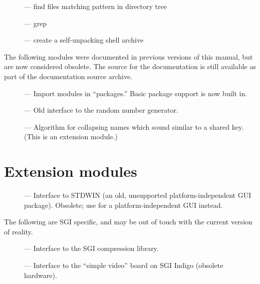 \begin{description}
\item[]
--- find files matching pattern in directory tree

\item[]
--- grep

\item[]
--- create a self-unpacking \UNIX{} shell archive
\end{description}


The following modules were documented in previous versions of this
manual, but are now considered obsolete.  The source for the
documentation is still available as part of the documentation source
archive.

\begin{description}
\item[]
--- Import modules in ``packages.''  Basic package support is now
built in.

\item[]
--- Old interface to the random number generator.

\item[]
--- Algorithm for collapsing names which sound similar to a shared
key.  (This is an extension module.)
\end{description}


\section{Extension modules}

\begin{description}
\item[]
--- Interface to STDWIN (an old, unsupported
platform-independent GUI package).  Obsolete; use  for
a platform-independent GUI instead.
\end{description}

The following are SGI specific, and may be out of touch with the
current version of reality.

\begin{description}
\item[]
--- Interface to the SGI compression library.

\item[]
--- Interface to the ``simple video'' board on SGI Indigo
(obsolete hardware).
\end{description}
